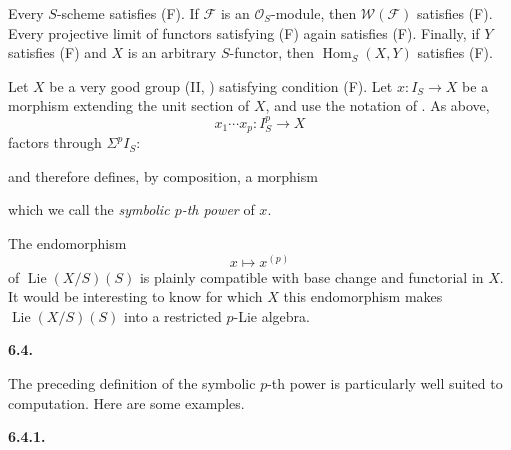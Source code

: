 Every \(S\)-scheme satisfies (F). If \(\mathcal F\) is an
\(\mathcal O_S\)-module, then \(\mathcal W(\mathcal F)\)
satisfies (F). Every projective limit of functors satisfying
(F) again satisfies (F). Finally, if \(Y\) satisfies (F) and
\(X\) is an arbitrary \(S\)-functor, then
\(\operatorname{Hom}_S(X,Y)\) satisfies (F).

Let \(X\) be a very good group (II, ) satisfying condition
(F). Let \(x:I_S\to X\) be a morphism extending the unit section
of \(X\), and use the notation of . As above,
\[
  x_1\cdots x_p:I_S^p\longrightarrow X
\]
factors through \(\Sigma^p I_S\):
\begin{center}
  \label{sga3:VIIA:6.3-symbolic-power-factorization}
  
\end{center}
and therefore defines, by composition, a morphism
\begin{center}
  \label{sga3:VIIA:6.3-symbolic-pth-power-composite}
  
\end{center}
which we call the \emph{symbolic \(p\)-th power} of \(x\).

The endomorphism
\[
  x\longmapsto x^{(p)}
\]
of \(\operatorname{Lie}(X/S)(S)\) is plainly compatible with
base change and functorial in \(X\). It would be interesting to
know for which \(X\) this endomorphism makes
\(\operatorname{Lie}(X/S)(S)\) into a restricted \(p\)-Lie
algebra.

\medskip
\noindent\textbf{6.4.}
\label{sga3:VIIA:6.4}

The preceding definition of the symbolic \(p\)-th power is
particularly well suited to computation. Here are some
examples.

\medskip
\noindent\textbf{6.4.1.}
\label{sga3:VIIA:6.4.1}

